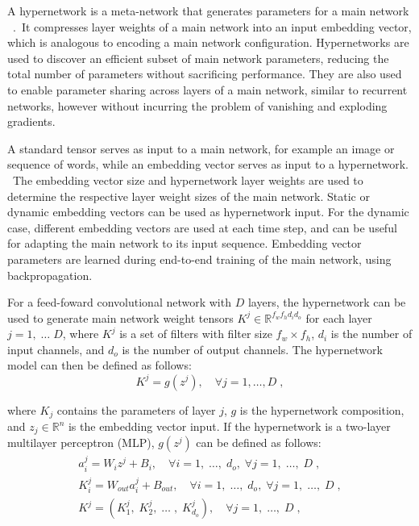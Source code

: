 A hypernetwork is a meta-network that generates parameters for a main network \unskip ~\citep{ha2016hypernetworks}.\ It compresses layer weights of a main network into an input embedding vector, which is analogous to encoding a main network configuration. Hypernetworks are used to discover an efficient subset of main network parameters, reducing the total number of parameters without sacrificing performance. They are also used to enable parameter sharing across layers of a main network, similar to recurrent networks, however without incurring the problem of vanishing and exploding gradients. \par

\noindent A standard tensor serves as input to a main network, for example an image or sequence of words, while an embedding vector serves as input to a hypernetwork. \ The embedding vector size and hypernetwork layer weights are used to determine the respective layer weight sizes of the main network. Static or dynamic embedding vectors  can be used as hypernetwork input. For the dynamic case, different embedding vectors are used at each time step, and can be useful for adapting the main network to its input sequence. Embedding vector parameters are learned during end-to-end training of the main network, using backpropagation. \par

\noindent For a feed-foward convolutional network with $ D $ layers, the hypernetwork can be used to generate main network weight tensors $ K^j \in \mathbb{R}^{f_wf_hd_id_o} $ for each layer $ j = 1, \; \dots \; D $, where $ K^j $ is a set of filters with filter size $ f_w \times f_h $, $ d_i $ is the number of input channels, and $ d_o $ is the number of output channels. The hypernetwork model can then be defined as follows: 
\begin{equation}
	K^j = g(z^j), \quad \forall j = 1, \dots, D \; ,
\end{equation}

\noindent where $ K_j $ contains the parameters of layer $ j $, $ g $ is the hypernetwork composition, and $ z_j \in \mathbb{R}^n $ is the embedding vector input. If the hypernetwork is a two-layer multilayer perceptron (MLP), $ g(z^j) $ can be defined as follows:  
\begin{subequations}
	\begin{gather}
		a_i^j = W_iz^j + B_i, \quad \forall i = 1, \; \dots, \; d_o, \; \forall j = 1, \; \dots, \; D \; , \\
		K_i^j = W_{out}a_i^j + B_{out}, \quad \forall i = 1, \; \dots, \; d_o, \; \forall j = 1, \; \dots, \; D \; , \\
		K^j = (K_1^j, \; K_2^j, \; \dots \;, \; K_{d_o}^j), \quad \forall j = 1, \; \dots, \; D \; ,
	\end{gather}
\end{subequations}

